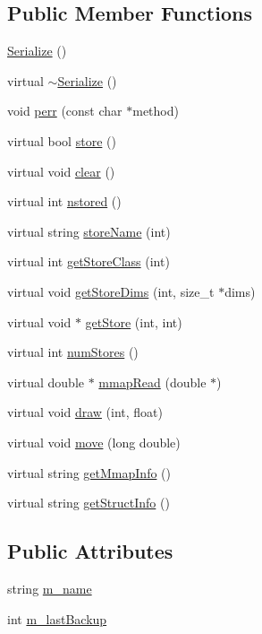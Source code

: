 \subsection*{Public Member Functions}
\begin{DoxyCompactItemize}
\item 
\hyperlink{classSerialize_ab594f8f89b0be6b0c1439516a01fc7f7}{Serialize} ()
\item 
virtual \hyperlink{classSerialize_a44999f67289d084f299ac0e9cfb1135d}{$\sim$\-Serialize} ()
\item 
void \hyperlink{classSerialize_aabbc8730e307d42c99741443c036ca97}{perr} (const char $\ast$method)
\item 
virtual bool \hyperlink{classSerialize_a3cda20e84a530870a6115eaaf589f168}{store} ()
\item 
virtual void \hyperlink{classSerialize_a11cbf006415c08d1891ab42e39a2aa1a}{clear} ()
\item 
virtual int \hyperlink{classSerialize_a590b7308112b07581c03ba826ace50b4}{nstored} ()
\item 
virtual string \hyperlink{classSerialize_ac94a76de6c9376e33b4c195d50ff0568}{store\-Name} (int)
\item 
virtual int \hyperlink{classSerialize_a69954cc86d03b75b6b27511aec4aba43}{get\-Store\-Class} (int)
\item 
virtual void \hyperlink{classSerialize_a52034c5c17bc5e7e6c728b4e6c620c05}{get\-Store\-Dims} (int, size\-\_\-t $\ast$dims)
\item 
virtual void $\ast$ \hyperlink{classSerialize_a6e589d263cfdc0eb72e41687c58831f2}{get\-Store} (int, int)
\item 
virtual int \hyperlink{classSerialize_a71bf2a906fd71477308a942d01490ab3}{num\-Stores} ()
\item 
virtual double $\ast$ \hyperlink{classSerialize_a28b939242880e565a8906b30acd0f84c}{mmap\-Read} (double $\ast$)
\item 
virtual void \hyperlink{classSerialize_a0cf1d14e41052c6eabe53c90a37c227b}{draw} (int, float)
\item 
virtual void \hyperlink{classSerialize_a06cf228664e659c8490c63ee36f34e28}{move} (long double)
\item 
virtual string \hyperlink{classSerialize_a0100618d428589974b6b80d4232e91ff}{get\-Mmap\-Info} ()
\item 
virtual string \hyperlink{classSerialize_a343c898670261dc23b955127de1574cd}{get\-Struct\-Info} ()
\end{DoxyCompactItemize}
\subsection*{Public Attributes}
\begin{DoxyCompactItemize}
\item 
string \hyperlink{classSerialize_a9fdb3475fed69e393e8421a21a22a241}{m\-\_\-name}
\item 
int \hyperlink{classSerialize_a011cc1272d6018ef424f11b33b652019}{m\-\_\-last\-Backup}
\end{DoxyCompactItemize}


